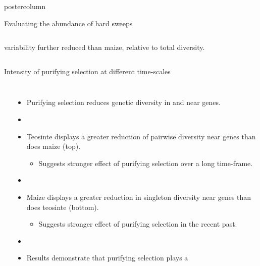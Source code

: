 \documentclass[final]{beamer}
\begin{document}
\begin{frame}
\begin{columns}
\begin{column}{.49\textwidth}
\begin{beamercolorbox}[center,wd=\textwidth]{postercolumn}
\begin{minipage}[T]{.95\textwidth}
{\begin{block}{Evaluating the abundance of hard sweeps}
\begin{columns}
\begin{itemize}
                  variability further reduced than maize, relative to
                  total diversity.
              \end{itemize}
              \centering
              \end{columns}
            \end{block}
            \vfill
            \begin{block}{Intensity of purifying selection at different time-scales}
              \begin{columns}
              \centering
              \\
              \begin{itemize}
                \item Purifying selection reduces genetic diversity in
                  and near genes.
                \item[]
                \item Teosinte displays a greater reduction of pairwise diversity near
                  genes than does maize (top).
                  \begin{itemize}
                    \item Suggests stronger effect of purifying
                      selection over a long time-frame.
                  \end{itemize}
                \item[]
                \item Maize displays a greater reduction in singleton
                  diversity near genes than does teosinte (bottom).
                  \begin{itemize}
                    \item Suggests stronger effect of purifying
                      selection in the recent past.
                  \end{itemize}
                \item[]
                \item Results demonstrate that purifying selection plays a

\end{itemize}
\end{columns}
\end{block}}
\end{minipage}
\end{beamercolorbox}
\end{column}
\end{columns}
\end{frame}
\end{document}
